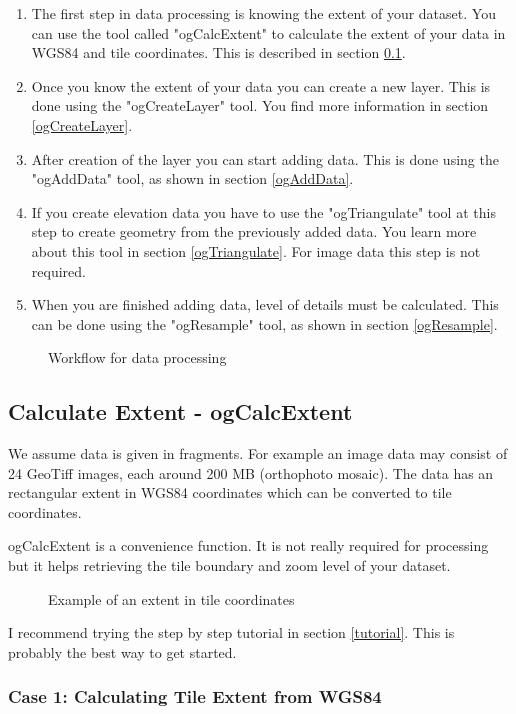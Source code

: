 \documentclass[
	12pt,
	a4paper,
	english,	
	appendixprefix,				     			        
	openany,		     	
	abstracton,		    		    
 	BCOR8mm,		    
]{scrartcl}
\newcommand{\bild}[2]{\begin{figure}[H]
      \centering
      \noindent{\texttt{[image: \#1]}}\caption{#2}
\end{figure}}
\newcommand{\bildorig}[2]{\begin{figure}[H]
      \centering
      \noindent{\texttt{[image: \#1]}}\caption{#2}
\end{figure}}
\begin{document}
\begin{enumerate}
\item The first step in data processing is knowing the extent of your dataset. You can use the tool called "ogCalcExtent" to calculate the extent of your data in WGS84 and tile coordinates. This is described in section \ref{ogCalcExtent}.
%
\item Once you know the extent of your data you can create a new layer. This is done using the "ogCreateLayer" tool. You find more information in section \ref{ogCreateLayer}.
%
\item After creation of the layer you can start adding data. This is done using the "ogAddData" tool, as shown in section \ref{ogAddData}.
%
\item If you create elevation data you have to use the "ogTriangulate" tool at this step to create geometry from the previously added data. You learn more about this tool in section \ref{ogTriangulate}. For image data this step is not required.
%
\item When you are finished adding data, level of details must be calculated. This can be done using the "ogResample" tool, as shown in section \ref{ogResample}.
\end{enumerate}

\bild{images/principle.png}{Workflow for data processing}

\subsection{Calculate Extent - ogCalcExtent}\label{ogCalcExtent}

We assume data is given in fragments. For example an image data may consist of 24 GeoTiff images, each around 200 MB (orthophoto mosaic). The data has an rectangular extent in WGS84 coordinates which can be converted to tile coordinates.

ogCalcExtent is a convenience function. It is not really required for processing but it helps retrieving the tile boundary and zoom level of your dataset.

\bildorig{images/extent.png}{Example of an extent in tile coordinates}

I recommend trying the step by step tutorial in section \ref{tutorial}. This is probably the best way to get started.


\subsubsection{Case 1: Calculating Tile Extent from WGS84}
\end{document}
